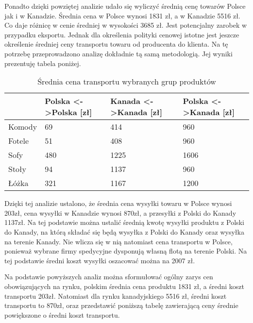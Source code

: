 		Ponadto dzięki powziętej analizie udało się wyliczyć średnią cenę towarów Polsce jak i w Kanadzie. Średnia cena w Polsce wynosi 1831 zł, a w Kanadzie 5516 zł. Co daje różnicę w cenie średniej w wysokości 3685 zł. Jest potencjalny zarobek w przypadku eksportu. Jednak dla określenia polityki cenowej istotne jest jeszcze określenie średniej ceny transportu towaru od producenta do klienta. Na tę potrzebę przeprowadzono analizę dokładnie tą samą metodologią. Jej wyniki prezentuję tabela poniżej.
		
		\begin{table}[H]
		\centering
		\begin{tabular}{|l|l|l|l|}
		\hline
					& Polska \textless-\textgreater Polska [zł] & Kanada \textless-\textgreater Kanada [zł] & Polska \textless-\textgreater Kanada [zł] \\ \hline
		Komody 	& 69                                 & 414                                & 960                                \\ \hline
		Fotele 	& 51                                 & 408                                & 960                                \\ \hline
		Sofy   	& 480                                & 1225                               & 1606                               \\ \hline
		Stoły  	& 94                                 & 1137                               & 960                                \\ \hline
		Łóżka  	& 321                               	& 1167                               & 1200                               \\ \hline
		\end{tabular}
		\caption{Średnia cena transportu wybranych grup produktów}
		\label{avg_grp_shp_price}
		\end{table}
		
		Dzięki tej analizie ustalono, że średnia cena wysyłki towaru w Polsce wynosi 203zł, cena wysyłki w Kanadzie wynosi 870zł, a przesyłki z Polski do Kanady 1137zł. Na tej podstawie można ustalić średnią kwotę wysyłki produktu z Polski do Kanady, na którą składać się będą wysyłka z Polski do Kanady oraz wysyłka na terenie Kanady. Nie wlicza się w nią natomiast cena transportu w Polsce, ponieważ wybrane firmy spedycyjne dysponują własną flotą na terenie Polski. Na tej podstawie średni koszt wysyłki oszacować można na 2007 zł.
		
		Na podstawie powyższych analiz można sformułować ogólny zarys cen obowiązujących na rynku, polskim średnia cena produktu 1831 zł, a średni koszt transportu 203zł. Natomiast dla rynku kanadyjskiego 5516 zł, średni koszt transportu to 870zł, oraz przedstawić poniższą tabelę zawierającą ceny średnie powiększone o średni koszt transportu.
		
